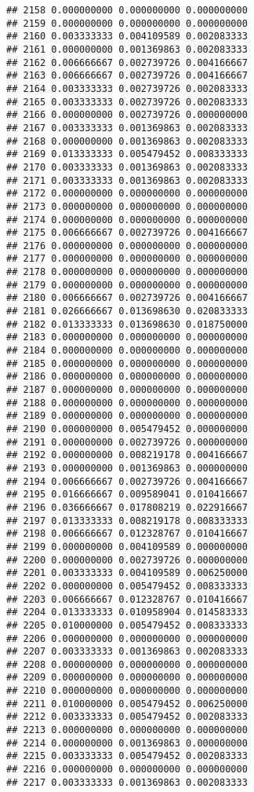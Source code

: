 \documentclass[
]{article}
\begin{document}
\begin{verbatim}
## 2158 0.000000000 0.000000000 0.000000000
## 2159 0.000000000 0.000000000 0.000000000
## 2160 0.003333333 0.004109589 0.002083333
## 2161 0.000000000 0.001369863 0.002083333
## 2162 0.006666667 0.002739726 0.004166667
## 2163 0.006666667 0.002739726 0.004166667
## 2164 0.003333333 0.002739726 0.002083333
## 2165 0.003333333 0.002739726 0.002083333
## 2166 0.000000000 0.002739726 0.000000000
## 2167 0.003333333 0.001369863 0.002083333
## 2168 0.000000000 0.001369863 0.002083333
## 2169 0.013333333 0.005479452 0.008333333
## 2170 0.003333333 0.001369863 0.002083333
## 2171 0.003333333 0.001369863 0.002083333
## 2172 0.000000000 0.000000000 0.000000000
## 2173 0.000000000 0.000000000 0.000000000
## 2174 0.000000000 0.000000000 0.000000000
## 2175 0.006666667 0.002739726 0.004166667
## 2176 0.000000000 0.000000000 0.000000000
## 2177 0.000000000 0.000000000 0.000000000
## 2178 0.000000000 0.000000000 0.000000000
## 2179 0.000000000 0.000000000 0.000000000
## 2180 0.006666667 0.002739726 0.004166667
## 2181 0.026666667 0.013698630 0.020833333
## 2182 0.013333333 0.013698630 0.018750000
## 2183 0.000000000 0.000000000 0.000000000
## 2184 0.000000000 0.000000000 0.000000000
## 2185 0.000000000 0.000000000 0.000000000
## 2186 0.000000000 0.000000000 0.000000000
## 2187 0.000000000 0.000000000 0.000000000
## 2188 0.000000000 0.000000000 0.000000000
## 2189 0.000000000 0.000000000 0.000000000
## 2190 0.000000000 0.005479452 0.000000000
## 2191 0.000000000 0.002739726 0.000000000
## 2192 0.000000000 0.008219178 0.004166667
## 2193 0.000000000 0.001369863 0.000000000
## 2194 0.006666667 0.002739726 0.004166667
## 2195 0.016666667 0.009589041 0.010416667
## 2196 0.036666667 0.017808219 0.022916667
## 2197 0.013333333 0.008219178 0.008333333
## 2198 0.006666667 0.012328767 0.010416667
## 2199 0.000000000 0.004109589 0.000000000
## 2200 0.000000000 0.002739726 0.000000000
## 2201 0.003333333 0.004109589 0.006250000
## 2202 0.000000000 0.005479452 0.008333333
## 2203 0.006666667 0.012328767 0.010416667
## 2204 0.013333333 0.010958904 0.014583333
## 2205 0.010000000 0.005479452 0.008333333
## 2206 0.000000000 0.000000000 0.000000000
## 2207 0.003333333 0.001369863 0.002083333
## 2208 0.000000000 0.000000000 0.000000000
## 2209 0.000000000 0.000000000 0.000000000
## 2210 0.000000000 0.000000000 0.000000000
## 2211 0.010000000 0.005479452 0.006250000
## 2212 0.003333333 0.005479452 0.002083333
## 2213 0.000000000 0.000000000 0.000000000
## 2214 0.000000000 0.001369863 0.000000000
## 2215 0.003333333 0.005479452 0.002083333
## 2216 0.000000000 0.000000000 0.000000000
## 2217 0.003333333 0.001369863 0.002083333

\end{verbatim}
\end{document}
